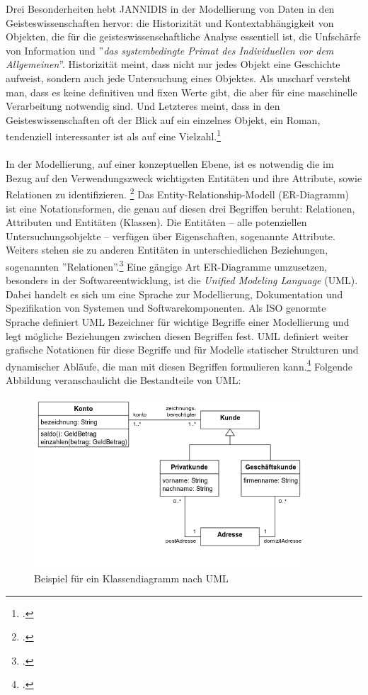 \documentclass[12pt,a4paper]{article}
\begin{document}
Drei Besonderheiten hebt JANNIDIS in der Modellierung von Daten in den Geisteswissenschaften hervor: die Historizität und Kontextabhängigkeit von Objekten, die für die geisteswissenschaftliche Analyse essentiell ist, die Unfschärfe von Information und ''\textit{das systembedingte Primat des Individuellen vor dem Allgemeinen}''. Historizität meint, dass nicht nur jedes Objekt eine Geschichte aufweist, sondern auch jede Untersuchung eines Objektes. Als unscharf versteht man, dass es keine definitiven und fixen Werte gibt, die aber für eine maschinelle Verarbeitung notwendig sind. Und Letzteres meint, dass in den Geisteswissenschaften oft der Blick auf ein einzelnes Objekt, ein Roman, tendenziell interessanter ist als auf eine Vielzahl.\footcite[][S.106-108]{jannidis2017grundlagen}
\\
\\
In der Modellierung, auf einer konzeptuellen Ebene, ist es notwendig die im Bezug auf den Verwendungszweck wichtigsten Entitäten und ihre Attribute, sowie Relationen zu identifizieren. \footcite[][S.102-104]{jannidis2017grundlagen} Das Entity-Relationship-Modell (ER-Diagramm) ist eine Notationsformen, die genau auf diesen drei Begriffen beruht: Relationen, Attributen und Entitäten (Klassen). Die Entitäten -- alle potenziellen Untersuchungsobjekte -- verfügen über Eigenschaften, sogenannte Attribute. Weiters stehen sie zu anderen Entitäten in unterschiedlichen Beziehungen, sogenannten ''Relationen''.\footcite{chen1976entity} Eine gängige Art ER-Diagramme umzusetzen, besonders in der Softwareentwicklung, ist die \textit{Unified Modeling Language} (UML). Dabei handelt es sich um eine Sprache zur Modellierung, Dokumentation und Spezifikation von Systemen und Softwarekomponenten. Als ISO genormte Sprache definiert UML Bezeichner für wichtige Begriffe einer Modellierung und legt mögliche Beziehungen zwischen diesen Begriffen fest. UML definiert weiter grafische Notationen für diese Begriffe und für Modelle statischer Strukturen und dynamischer Abläufe, die man mit diesen Begriffen formulieren kann.\footcite{rumbaugh2004unified} Folgende Abbildung veranschaulicht die Bestandteile von UML:
\begin{figure}[H]
\centering
	\includegraphics[width=0.9\textwidth]{img/uml.png}  
    \caption[Beispiel für ein Klassendiagramm nach UML, \protect\url{https://de.wikipedia.org/wiki/Unified_Modeling_Language}, 10.06.2019]{Beispiel für ein Klassendiagramm nach UML}\label{fig:uml}
\end{figure} 
\end{document}
